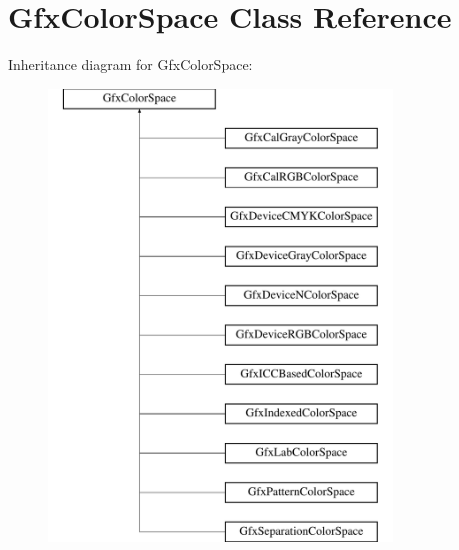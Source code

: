 \hypertarget{class_gfx_color_space}{}\section{Gfx\+Color\+Space Class Reference}
\label{class_gfx_color_space}
Inheritance diagram for Gfx\+Color\+Space\+:\begin{figure}[H]
\begin{center}
\leavevmode
\includegraphics[height=12.000000cm]{class_gfx_color_space}
\end{center}
\end{figure}
